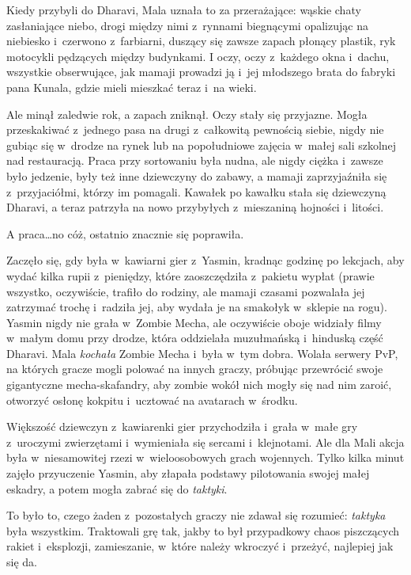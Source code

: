 \documentclass[oneside,polish,11pt,rmheadings]{mwbk}
\begin{document}
Kiedy przybyli do Dharavi, Mala uznała to za przerażające: wąskie chaty zasłaniające niebo, drogi między nimi z~rynnami biegnącymi opalizując na niebiesko i~czerwono z~farbiarni, duszący się zawsze zapach płonący plastik, ryk motocykli pędzących między budynkami. I oczy, oczy z~każdego okna i~dachu, wszystkie obserwujące, jak mamaji prowadzi ją i~jej młodszego brata do fabryki pana Kunala, gdzie mieli mieszkać teraz i~na wieki. 


Ale minął zaledwie rok, a zapach zniknął. Oczy stały się przyjazne. Mogła przeskakiwać z~jednego pasa na drugi z~całkowitą pewnością siebie, nigdy nie gubiąc się w~drodze na rynek lub na popołudniowe zajęcia w~małej sali szkolnej nad restauracją. Praca przy sortowaniu była nudna, ale nigdy ciężka i~zawsze było jedzenie, były też inne dziewczyny do zabawy, a mamaji zaprzyjaźniła się z~przyjaciółmi, którzy im pomagali. Kawałek po kawałku stała się dziewczyną Dharavi, a teraz patrzyła na nowo przybyłych z~mieszaniną hojności i~litości. 


A praca\ldots  no cóż, ostatnio znacznie się poprawiła. 


Zaczęło się, gdy była w~kawiarni gier z~Yasmin, kradnąc godzinę po lekcjach, aby wydać kilka rupii z~pieniędzy, które zaoszczędziła z~pakietu wypłat (prawie wszystko, oczywiście, trafiło do rodziny, ale mamaji czasami pozwalała jej zatrzymać trochę i~radziła jej, aby wydała je na smakołyk w~sklepie na rogu). Yasmin nigdy nie grała w~Zombie Mecha, ale oczywiście oboje widziały filmy w~małym domu przy drodze, która oddzielała muzułmańską i~hinduską część Dharavi. Mala \textit{kochała }Zombie Mecha i~była w~tym dobra. Wolała serwery PvP, na których gracze mogli polować na innych graczy, próbując przewrócić swoje gigantyczne mecha-skafandry, aby zombie wokół nich mogły się nad nim zaroić, otworzyć osłonę kokpitu i~ucztować na avatarach w~środku. 


Większość dziewczyn z~kawiarenki gier przychodziła i~grała w~małe gry z~uroczymi zwierzętami i~wymieniała się sercami i~klejnotami. Ale dla Mali akcja była w~niesamowitej rzezi w~wieloosobowych grach wojennych. Tylko kilka minut zajęło przyuczenie Yasmin, aby złapała podstawy pilotowania swojej małej eskadry, a potem mogła zabrać się do \textit{taktyki}. 


To było to, czego żaden z~pozostałych graczy nie zdawał się rozumieć: \textit{taktyka }była wszystkim. Traktowali grę tak, jakby to był przypadkowy chaos piszczących rakiet i~eksplozji, zamieszanie, w~które należy wkroczyć i~przeżyć, najlepiej jak się da. 
\end{document}
